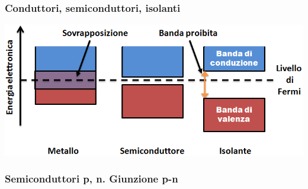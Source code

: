 \frame
    {
      \frametitle{Conduttori, semiconduttori, isolanti}

      \includegraphics[width=1.0\linewidth]{figs/Stru.png}

    }

\frame
    {
      \frametitle{Semiconduttori p, n. Giunzione p-n}

    }


